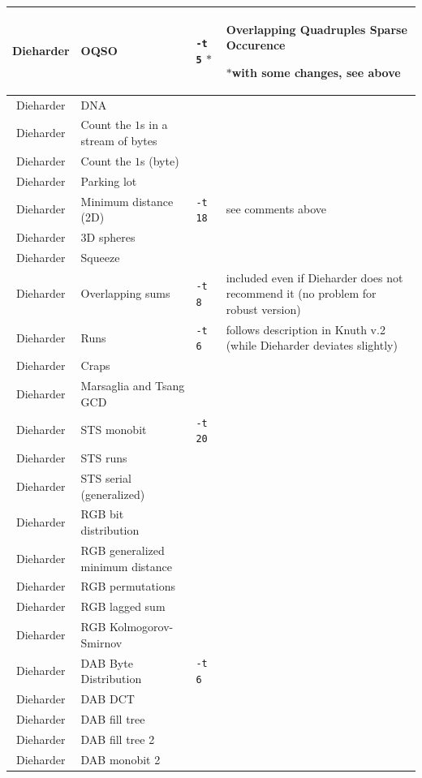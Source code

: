 \documentclass[12pt,a4paper,fullpage]{article}
\begin{document}
\begin{longtable}{|c|>{\raggedright\arraybackslash}p{3cm}|l|>{\raggedright\arraybackslash}p{4cm}|}
Dieharder & OQSO & \texttt{-t 5} $*$ & Overlapping Quadruples Sparse Occurence \par $*$with some changes, see above\\ \hline %
Dieharder & DNA & & \\ \hline %
Dieharder & Count the $1$s  in a stream of bytes & & \\ \hline %
Dieharder & Count the $1$s (byte) & &\\ \hline %
Dieharder & Parking lot  & &\\ \hline %
Dieharder &  Minimum distance (2D)& \texttt{-t 18} & see comments above\\ \hline %
Dieharder &  3D spheres & &\\ \hline %
Dieharder &  Squeeze & &\\ \hline %
Dieharder &  Overlapping sums&\texttt{-t 8} & included even if Dieharder does not recommend it (no problem for robust version)\\ \hline %
Dieharder &  Runs &\texttt{-t 6} & follows description in Knuth v.2 (while Dieharder deviates slightly) \\ \hline%
Dieharder &  Craps & &\\ \hline %
Dieharder &  Marsaglia and Tsang GCD& &\\ \hline %
Dieharder &  STS monobit & \texttt{-t 20}&\\ \hline %
Dieharder & STS runs& & \\ \hline %
Dieharder & STS serial (generalized)& & \\ \hline %
Dieharder & RGB bit distribution& & \\ \hline %
Dieharder & RGB generalized minimum distance& & \\ \hline %
Dieharder & RGB permutations & & \\ \hline %
Dieharder & RGB lagged sum& & \\ \hline %
Dieharder & RGB Kolmogorov-Smirnov& & \\ \hline %
Dieharder & DAB Byte Distribution& \texttt{-t 6}& \\ \hline %
Dieharder & DAB DCT& & \\ \hline %
Dieharder & DAB fill tree& & \\ \hline %
Dieharder & DAB fill tree 2& & \\ \hline %
Dieharder & DAB monobit 2& & \\ \hline %


\end{longtable}
\end{document}
